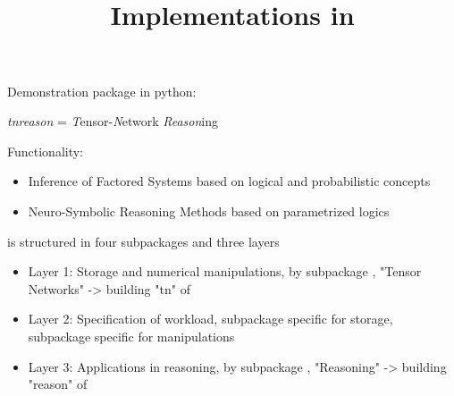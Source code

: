 \documentclass{beamer}
\title[\tnreason]{
	\coursechapterone \\
	{\huge Implementations in \tnreason{}}
}
\begin{document}
{\frame[plain]{\titlepage}}


\begin{frame}{Demonstration package in python: \tnreason{}}

\begin{center}
	\emph{tnreason} = \emph{T}ensor-\emph{N}etwork \emph{Reason}ing
\end{center}

Functionality:
\begin{itemize}
	\item Inference of Factored Systems based on logical and probabilistic concepts
	\item Neuro-Symbolic Reasoning Methods based on parametrized logics
\end{itemize}


\tnreason is structured in four subpackages and three layers
\begin{itemize}
	\item Layer 1: Storage and numerical manipulations, by subpackage \spengine, "Tensor Networks" -> building "tn" of \tnreason
	\item Layer 2: Specification of workload, subpackage \sprepresentation{} specific for storage, subpackage \spreasoning{} specific for manipulations
	\item Layer 3: Applications in reasoning, by subpackage \spapplication{}, "Reasoning" -> building "reason" of \tnreason
\end{itemize}



\end{frame}
\end{document}

